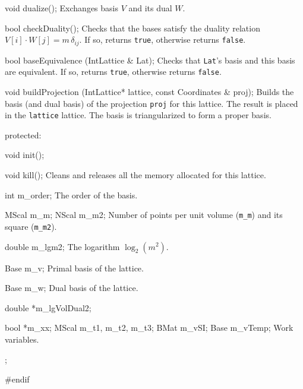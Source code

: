 {{   void dualize();
\endcode
\tabb
Exchanges basis $V$ and its dual $W$.
\endtabb
\code

   bool checkDuality();
\endcode
\tabb
   Checks that the bases satisfy the duality relation
   $V[i]\cdot W[j] = m\,\delta_{ij}$. If so, returns \texttt{true}, otherwise
   returns \texttt{false}.
\endtabb
\code

   bool baseEquivalence (IntLattice & Lat);
\endcode
\tabb
   Checks that \texttt{Lat}'s basis and this basis are equivalent.
   If so, returns \texttt{true}, otherwise returns \texttt{false}.
\endtabb
\code

   void buildProjection (IntLattice* lattice, const Coordinates & proj);
\endcode
\tabb
Builds the basis (and dual basis) of the projection \texttt{proj} for this
lattice.  The result is placed in the \texttt{lattice} lattice. The basis is
triangularized to form a proper basis.
\endtabb
\code


protected:

   void init();
\endcode
\tabb
\endtabb
\code

   void kill();
\endcode
\tabb
Cleans and releases all the memory allocated for this lattice.
\endtabb
\code

   int m_order;
\endcode
\tabb
The order of the basis.
\endtabb
\code

   MScal m_m;
   NScal m_m2;
\endcode
\tabb
Number of points per unit volume (\texttt{m\_m}) and its square (\texttt{m\_m2}).
\endtabb
\code

   double m_lgm2;
\endcode
\tabb
  The logarithm $\log_2 (m^2)$.
\endtabb
\code

   Base m_v;
\endcode
\tabb
Primal basis of the lattice.
\endtabb
\code

   Base m_w;
\endcode
\tabb
Dual basis of the lattice.
\endtabb
\code

   double *m_lgVolDual2;
\endcode
\tabb
\endtabb
\code

   bool *m_xx;
   MScal m_t1, m_t2, m_t3;
   BMat m_vSI;
   Base m_vTemp;
\endcode
\tabb
Work variables.
\endtabb
\code
};

}
\hide
#endif
\endhide
\endcode
